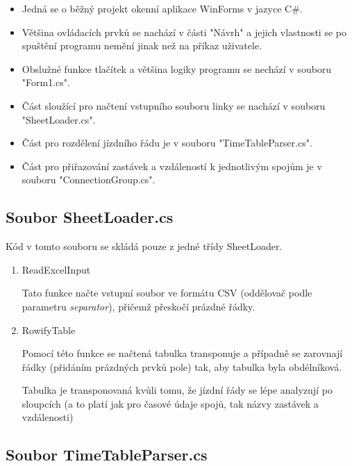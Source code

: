 \documentclass[14pt]{article}
\begin{document}
\begin{itemize}
\item Jedná se o běžný projekt okenní aplikace WinForms v jazyce C\#. 

\item Většina ovládacích prvků se nachází v části "Návrh" a jejich vlastnosti se po spuštění programu nemění jinak než na příkaz uživatele.

\item Obslužné funkce tlačítek a většina logiky programu se nechází v souboru "Form1.cs".

\item Část sloužící pro načtení vstupního souboru linky se nachází v souboru "SheetLoader.cs".

\item Část pro rozdělení jízdního řádu je v souboru "TimeTableParser.cs".

\item Část pro přiřazování zastávek a vzdáleností k jednotlivým spojům je v souboru "ConnectionGroup.cs".

\end{itemize} 

\subsection{Soubor SheetLoader.cs}

Kód v tomto souboru se skládá pouze z jedné třídy SheetLoader.
\begin{enumerate}

\item ReadExcelInput

Tato funkce načte vstupní soubor ve formátu CSV (oddělovač podle parametru \textit{separator}), přičemž přeskočí prázdné řádky.

\item RowifyTable

Pomocí této funkce se načtená tabulka transponuje a případně se zarovnají řádky (přidáním prázdných prvků pole) tak, aby tabulka byla obdélníková.

Tabulka je transponovaná kvůli tomu, že jízdní řády se lépe analyzují po sloupcích (a to platí jak pro časové údaje spojů, tak názvy zastávek a vzdálenosti)

\end{enumerate}

\subsection{Soubor TimeTableParser.cs}
\end{document}
